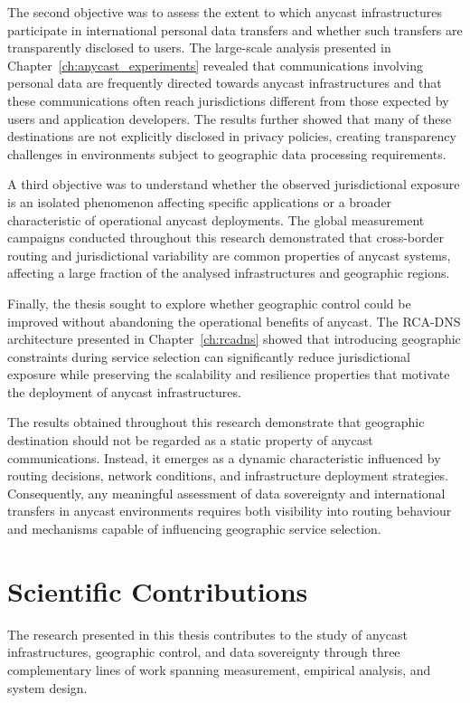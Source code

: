The second objective was to assess the extent to which anycast infrastructures participate in international personal data transfers and whether such transfers are transparently disclosed to users. The large-scale analysis presented in Chapter~\ref{ch:anycast_experiments} revealed that communications involving personal data are frequently directed towards anycast infrastructures and that these communications often reach jurisdictions different from those expected by users and application developers. The results further showed that many of these destinations are not explicitly disclosed in privacy policies, creating transparency challenges in environments subject to geographic data processing requirements.

A third objective was to understand whether the observed jurisdictional exposure is an isolated phenomenon affecting specific applications or a broader characteristic of operational anycast deployments. The global measurement campaigns conducted throughout this research demonstrated that cross-border routing and jurisdictional variability are common properties of anycast systems, affecting a large fraction of the analysed infrastructures and geographic regions.

Finally, the thesis sought to explore whether geographic control could be improved without abandoning the operational benefits of anycast. The RCA-DNS architecture presented in Chapter~\ref{ch:rcadns} showed that introducing geographic constraints during service selection can significantly reduce jurisdictional exposure while preserving the scalability and resilience properties that motivate the deployment of anycast infrastructures.

The results obtained throughout this research demonstrate that geographic destination should not be regarded as a static property of anycast communications. Instead, it emerges as a dynamic characteristic influenced by routing decisions, network conditions, and infrastructure deployment strategies. Consequently, any meaningful assessment of data sovereignty and international transfers in anycast environments requires both visibility into routing behaviour and mechanisms capable of influencing geographic service selection.

\section{Scientific Contributions}
\label{sc:conclusion_contributions}

The research presented in this thesis contributes to the study of anycast infrastructures, geographic control, and data sovereignty through three complementary lines of work spanning measurement, empirical analysis, and system design.

